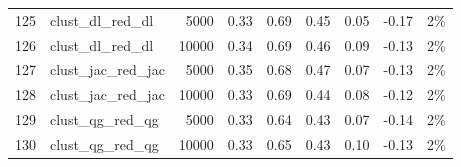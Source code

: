 \documentclass{praca1}
\begin{document}
\begin{table}[!h]
\begin{tabular}{|rlr|rrr|rr|r|}
   \hline
125 & clust\_dl\_red\_dl & 5000 & 0.33 & 0.69 & 0.45 & 0.05 & -0.17 & 2\% \\ 
  126 & clust\_dl\_red\_dl & 10000 & 0.34 & 0.69 & 0.46 & 0.09 & -0.13 & 2\% \\ 
   \hline
127 & clust\_jac\_red\_jac & 5000 & 0.35 & 0.68 & 0.47 & 0.07 & -0.13 & 2\% \\ 
  128 & clust\_jac\_red\_jac & 10000 & 0.33 & 0.69 & 0.44 & 0.08 & -0.12 & 2\% \\ 
   \hline
129 & clust\_qg\_red\_qg & 5000 & 0.33 & 0.64 & 0.43 & 0.07 & -0.14 & 2\% \\ 
  130 & clust\_qg\_red\_qg & 10000 & 0.33 & 0.65 & 0.43 & 0.10 & -0.13 & 2\% \\ 
   \hline
\end{tabular}
\end{table}






\end{document}
